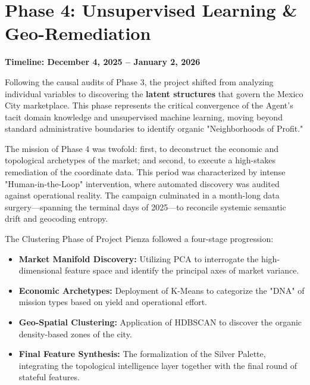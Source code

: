\section{Phase 4: Unsupervised Learning \& Geo-Remediation}

\noindent \textbf{Timeline: December 4, 2025 -- January 2, 2026}

Following the causal audits of Phase 3, the project shifted from analyzing individual variables to discovering the \textbf{latent structures} that govern the Mexico City marketplace. This phase represents the critical convergence of the Agent's tacit domain knowledge and unsupervised machine learning, moving beyond standard administrative boundaries to identify organic "Neighborhoods of Profit." 

The mission of Phase 4 was twofold: first, to deconstruct the economic and topological archetypes of the market; and second, to execute a high-stakes remediation of the coordinate data. This period was characterized by intense "Human-in-the-Loop" intervention, where automated discovery was audited against operational reality. The campaign culminated in a month-long data surgery—spanning the terminal days of 2025—to reconcile systemic semantic drift and geocoding entropy.

The Clustering Phase of Project Pienza followed a four-stage progression:

\begin{itemize}[noitemsep, topsep=3pt]
    \item \textbf{Market Manifold Discovery:} Utilizing PCA to interrogate the high-dimensional feature space and identify the principal axes of market variance.
    \item \textbf{Economic Archetypes:} Deployment of K-Means to categorize the "DNA" of mission types based on yield and operational effort.
    \item \textbf{Geo-Spatial Clustering:} Application of HDBSCAN to discover the organic density-based zones of the city.
    \item \textbf{Final Feature Synthesis:} The formalization of the Silver Palette, integrating the topological intelligence layer together with the final round of stateful features.
\end{itemize}

